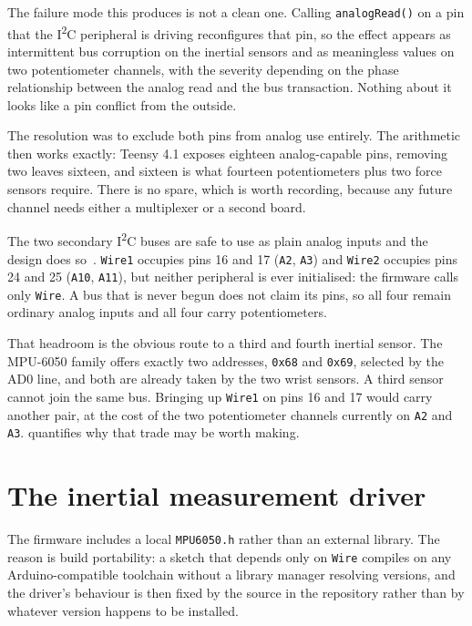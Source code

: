 The failure mode this produces is not a clean one. Calling
\texttt{analogRead()} on a pin that the I\textsuperscript{2}C peripheral is
driving reconfigures that pin, so the effect appears as intermittent bus
corruption on the inertial sensors and as meaningless values on two
potentiometer channels, with the severity depending on the phase relationship
between the analog read and the bus transaction. Nothing about it looks like a
pin conflict from the outside.

The resolution was to exclude both pins from analog use entirely. The
arithmetic then works exactly: Teensy 4.1 exposes eighteen analog-capable
pins, removing two leaves sixteen, and sixteen is what fourteen potentiometers
plus two force sensors require. There is no spare, which is worth recording,
because any future channel needs either a multiplexer or a second board.

The two secondary I\textsuperscript{2}C buses are safe to use as plain analog
inputs and the design does so~\cite{pjrc2020teensy41}. \texttt{Wire1} occupies pins 16 and 17
(\texttt{A2}, \texttt{A3}) and \texttt{Wire2} occupies pins 24 and 25
(\texttt{A10}, \texttt{A11}), but neither peripheral is ever initialised: the
firmware calls only \texttt{Wire}. A bus that is never begun does not claim
its pins, so all four remain ordinary analog inputs and all four carry
potentiometers.

That headroom is the obvious route to a third and fourth inertial sensor. The
MPU-6050 family offers exactly two addresses, \texttt{0x68} and \texttt{0x69},
selected by the AD0 line, and both are already taken by the two wrist sensors.
A third sensor cannot join the same bus. Bringing up \texttt{Wire1} on pins 16
and 17 would carry another pair, at the cost of the two potentiometer channels
currently on \texttt{A2} and \texttt{A3}.  quantifies why
that trade may be worth making.

\section{The inertial measurement driver}

The firmware includes a local \texttt{MPU6050.h} rather than an external
library. The reason is build portability: a sketch that depends only on
\texttt{Wire} compiles on any Arduino-compatible toolchain without a library
manager resolving versions, and the driver's behaviour is then fixed by the
source in the repository rather than by whatever version happens to be
installed.

